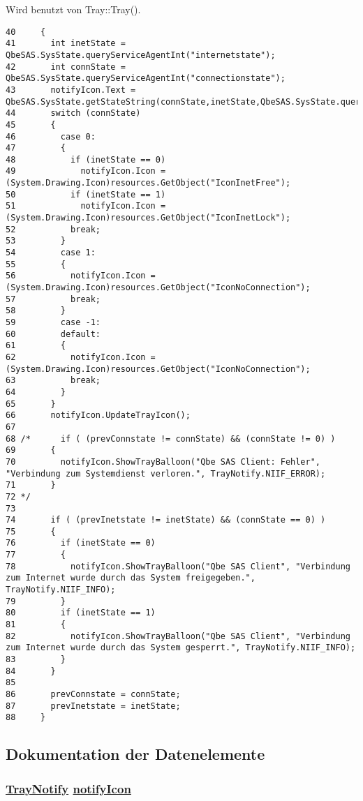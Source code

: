 Wird benutzt von Tray::Tray().



\footnotesize\begin{verbatim}40     {
41       int inetState = QbeSAS.SysState.queryServiceAgentInt("internetstate");
42       int connState = QbeSAS.SysState.queryServiceAgentInt("connectionstate");
43       notifyIcon.Text = QbeSAS.SysState.getStateString(connState,inetState,QbeSAS.SysState.queryServiceAgentStr("username"));
44       switch (connState)
45       {
46         case 0:
47         {
48           if (inetState == 0)
49             notifyIcon.Icon = (System.Drawing.Icon)resources.GetObject("IconInetFree");
50           if (inetState == 1)
51             notifyIcon.Icon = (System.Drawing.Icon)resources.GetObject("IconInetLock");
52           break;
53         }
54         case 1:
55         {
56           notifyIcon.Icon = (System.Drawing.Icon)resources.GetObject("IconNoConnection");
57           break;
58         }
59         case -1:
60         default:
61         {
62           notifyIcon.Icon = (System.Drawing.Icon)resources.GetObject("IconNoConnection");
63           break;
64         }
65       }
66       notifyIcon.UpdateTrayIcon();
67       
68 /*      if ( (prevConnstate != connState) && (connState != 0) )
69       {
70         notifyIcon.ShowTrayBalloon("Qbe SAS Client: Fehler", "Verbindung zum Systemdienst verloren.", TrayNotify.NIIF_ERROR);
71       } 
72 */      
73 
74       if ( (prevInetstate != inetState) && (connState == 0) )
75       {
76         if (inetState == 0)
77         {
78           notifyIcon.ShowTrayBalloon("Qbe SAS Client", "Verbindung zum Internet wurde durch das System freigegeben.", TrayNotify.NIIF_INFO);
79         }
80         if (inetState == 1)
81         {
82           notifyIcon.ShowTrayBalloon("Qbe SAS Client", "Verbindung zum Internet wurde durch das System gesperrt.", TrayNotify.NIIF_INFO);
83         }
84       }
85 
86       prevConnstate = connState;
87       prevInetstate = inetState;
88     }
\end{verbatim}\normalsize 


\subsection{Dokumentation der Datenelemente}
\hypertarget{classQbeTray_1_1Tray_QbeTray_1_1Trayr0}{
\subsubsection[notifyIcon]{\setlength{\rightskip}{0pt plus 5cm}\hyperlink{classQbeTray_1_1TrayNotify}{Tray\-Notify} \hyperlink{classQbeTray_1_1Tray_QbeTray_1_1Trayr0}{notify\-Icon}}}
\label{classQbeTray_1_1Tray_QbeTray_1_1Trayr0}




